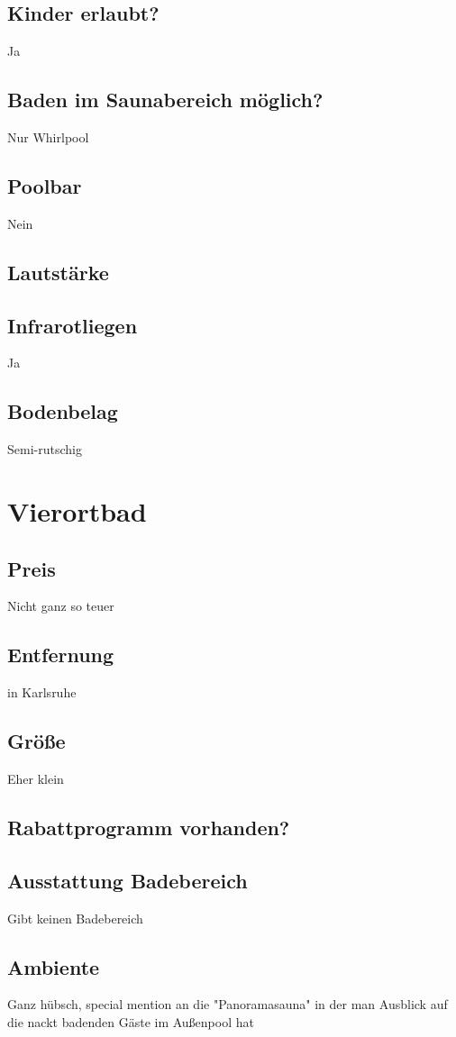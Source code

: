 \documentclass{article}
\begin{document}
\subsection*{Kinder erlaubt?} Ja
\subsection*{Baden im Saunabereich möglich?} Nur Whirlpool
\subsection*{Poolbar} Nein
\subsection*{Lautstärke}
\subsection*{Infrarotliegen} Ja
\subsection*{Bodenbelag} Semi-rutschig

\section*{Vierortbad}
\subsection*{Preis} Nicht ganz so teuer
\subsection*{Entfernung} in Karlsruhe
\subsection*{Größe} Eher klein
\subsection*{Rabattprogramm vorhanden?}
\subsection*{Ausstattung Badebereich} Gibt keinen Badebereich
\subsection*{Ambiente} Ganz hübsch, special mention an die "Panoramasauna" in der man Ausblick auf die nackt badenden Gäste im Außenpool hat
\end{document}
